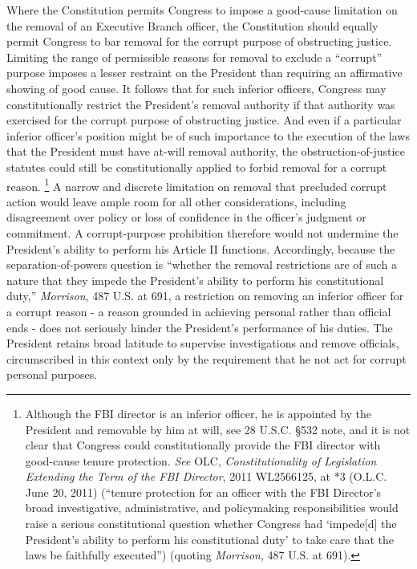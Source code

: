 Where the Constitution permits Congress to impose a good-cause limitation on the removal of an Executive Branch officer, the Constitution should equally permit Congress to bar removal for the corrupt purpose of obstructing justice.
Limiting the range of permissible reasons for removal to exclude a “corrupt” purpose imposes a lesser restraint on the President than requiring an affirmative showing of good cause.
It follows that for such inferior officers, Congress may constitutionally restrict the President’s removal authority if that authority was exercised for the corrupt purpose of obstructing justice.
And even if a particular inferior officer’s position might be of such importance to the execution of the laws that the President must have at-will removal authority, the obstruction-of-justice statutes could still be constitutionally applied to forbid removal for a corrupt reason.%
\footnote{Although the FBI director is an inferior officer, he is appointed by the President and removable by him at will, see 28 U.S.C. \S 532 note, and it is not clear that Congress could constitutionally provide the FBI director with good-cause tenure protection.
\textit{See} OLC, \textit{Constitutionality of Legislation Extending the Term of the FBI Director}, 2011 WL2566125, at *3 (O.L.C. June 20, 2011) (“tenure protection for an officer with the FBI Director’s broad investigative, administrative, and policymaking responsibilities would raise a serious constitutional question whether Congress had ‘impede[d] the President’s ability to perform his constitutional duty’ to take care that the laws be faithfully executed”) (quoting \textit{Morrison}, 487 U.S. at 691).}
A narrow and discrete limitation on removal that precluded corrupt action would leave ample room for all other considerations, including disagreement over policy or loss of confidence in the officer’s judgment or commitment.
A corrupt-purpose prohibition therefore would not undermine the President’s ability to perform his Article II functions.
Accordingly, because the separation-of-powers question is “whether the removal restrictions are of such a nature that they impede the President’s ability to perform his constitutional duty,” \textit{Morrison}, 487 U.S. at 691, a restriction on removing an inferior officer for a corrupt reason - a reason grounded in achieving personal rather than official ends - does not seriously hinder the President’s performance of his duties.
The President retains broad latitude to supervise investigations and remove officials, circumscribed in this context only by the requirement that he not act for corrupt personal purposes.%
